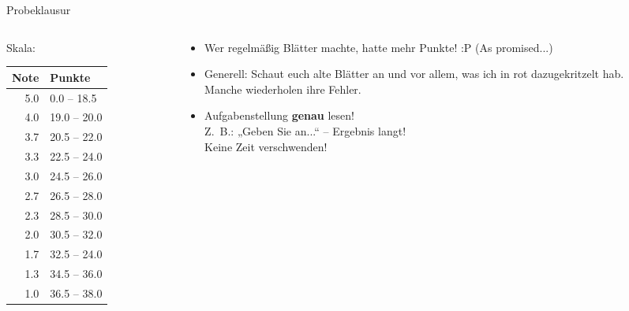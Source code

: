 




\morescalingdelimiters



\begin{frame}{Probeklausur}
	\begin{columns}[T] 
		\hspace{.5\baselineskip}
		\begin{column}[T]{.30\textwidth} 
			Skala: \\
			\begin{tabular}{|r|l|}
				\hline
				Note & Punkte \\
				\hline
				5.0	& \hphantom{0}0.0 – 18.5 	\\ \hline
				4.0 & 19.0 – 20.0	\\ \hline
				3.7 & 20.5 – 22.0	\\ \hline
				3.3	& 22.5 – 24.0	\\ \hline
				3.0	& 24.5 – 26.0	\\ \hline
				2.7	& 26.5 – 28.0	\\ \hline
				2.3	& 28.5 – 30.0	\\ \hline
				2.0	& 30.5 – 32.0   \\ \hline
				1.7	& 32.5 – 24.0	\\ \hline
				1.3	& 34.5 – 36.0	\\ \hline
				1.0	& 36.5 – 38.0	\\ \hline
			\end{tabular}
		\end{column}
		\hspace{-\baselineskip}
		\begin{column}[T]{.68\textwidth} 
			\begin{itemize}
				\item Wer regelmäßig Blätter machte, hatte mehr Punkte! :P {\small (As promised...)}
				\item Generell: Schaut euch alte Blätter an und vor allem, \alert{was ich in rot dazugekritzelt} hab. \\
				\impl Manche wiederholen ihre Fehler.
				\item Aufgabenstellung \textbf{genau} lesen! \\
				Z.~B.: „Geben Sie an...“ – Ergebnis langt! \\ \impl Keine Zeit verschwenden! 
				
			\end{itemize}
		\end{column}
	\end{columns}
	
\end{frame}


